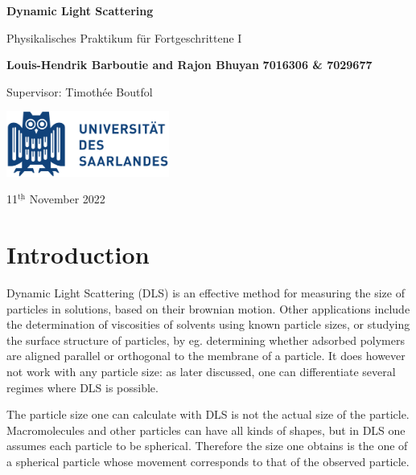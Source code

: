 \documentclass{article}
\begin{document}
\pagestyle{fancy}
\setlength{\headheight}{15pt}

\begin{titlepage}
    \begin{center}
        \vspace*{1cm}
        \Huge
        \textbf{Dynamic Light Scattering}
        
        \vspace{0.5cm}
        \LARGE
        Physikalisches Praktikum für Fortgeschrittene I
        
        \vspace{1.5cm}
        \textbf{Louis-Hendrik Barboutie and Rajon Bhuyan} \newline
        \textbf{7016306 \& 7029677}
        
        \vspace{0.5cm}
        \Large 
        Supervisor: Timothée Boutfol
        
        \vfill

        \includegraphics[width=0.4\textwidth]{logo_uni.png}
        
        \Large
        11$^{\underline{\text{th}}}$ November 2022
    \end{center}
\end{titlepage}

\tableofcontents
\newpage

\section{Introduction}
Dynamic Light Scattering (DLS) is an effective method for measuring the size of particles in solutions, based on their brownian motion. Other applications include the determination of viscosities of solvents using known particle sizes, or studying the surface structure of particles, by eg. determining whether adsorbed polymers are aligned parallel or orthogonal to the membrane of a particle. It does however not work with any particle size: as later discussed, one can differentiate several regimes where DLS is possible. 

The particle size one can calculate with DLS is not the actual size of the particle. Macromolecules and other particles can have all kinds of shapes, but in DLS one assumes each particle to be spherical. Therefore the size one obtains is the one of a spherical particle whose movement corresponds to that of the observed particle.
\end{document}
